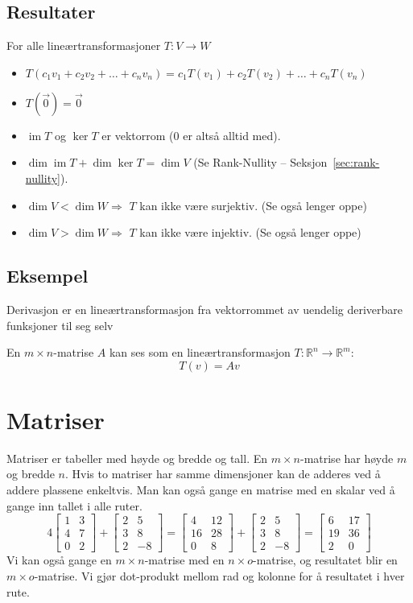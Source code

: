 \documentclass[12pt,a4paper,norsk]{article}
\newcommand{\R}{\mathbb{R}}
\newcommand{\imat}[1]{\left[\begin{smallmatrix}#1\end{smallmatrix}\right]} %
\DeclareMathOperator{\image}{im} %
\begin{document}
\subsection{Resultater}
For alle lineærtransformasjoner $T:V \rightarrow W$
\begin{itemize}
  \item $T(c_{1}v_{1} + c_{2}v_{2} + \ldots + c_{n}v_{n}) = c_{1}T(v_{1}) + c_{2}T(v_{2}) + \ldots + c_{n}T(v_{n})$
  \item $T(\vec{0}) = \vec{0}$
  \item $\image T$ og $\ker T$ er vektorrom (0 er altså alltid med).
  \item $\dim \image T + \dim \ker T = \dim V$ (Se Rank-Nullity --
    Seksjon~\ref{sec:rank-nullity}).
  \item $\dim V < \dim W \Rightarrow$ $T$ kan ikke være surjektiv. (Se også lenger oppe)
  \item $\dim V > \dim W \Rightarrow$ $T$ kan ikke være injektiv. (Se også lenger oppe)
\end{itemize}

\subsection{Eksempel}
Derivasjon er en lineærtransformasjon fra vektorrommet av uendelig deriverbare
funksjoner til seg selv

En $m \times n$-matrise $A$ kan ses som en lineærtransformasjon $T:\R^{n} \rightarrow \R^{m}$:
\[T(v) = A v\]

\section{Matriser}
Matriser er tabeller med høyde og bredde og tall. En $m \times n$-matrise har høyde
$m$ og bredde $n$. Hvis to matriser har samme dimensjoner kan de adderes ved å
addere plassene enkeltvis. Man kan også gange en matrise med en skalar ved å
gange inn tallet i alle ruter.
\[4\imat{1 & 3 \\ 4 & 7 \\ 0 & 2} + \imat{2 & 5 \\ 3 & 8 \\ 2 & -8} = \imat{4 & 12 \\ 16 & 28 \\ 0 & 8} + \imat{2 & 5 \\ 3 & 8 \\ 2 & -8} = \imat{6 & 17 \\ 19 & 36 \\ 2 & 0}\]
%
Vi kan også gange en $m \times n$-matrise med en $n \times o$-matrise, og resultatet blir
en $m \times o$-matrise. Vi gjør dot-produkt mellom rad og kolonne for å resultatet
i hver rute.
\end{document}
